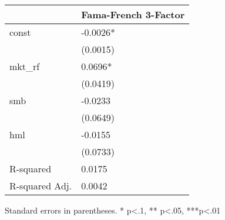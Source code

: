 \begin{table}
\caption{}
\label{}
\begin{center}
\begin{tabular}{ll}
\hline
               & Fama-French 3-Factor  \\
\hline
const          & -0.0026*              \\
               & (0.0015)              \\
mkt\_rf        & 0.0696*               \\
               & (0.0419)              \\
smb            & -0.0233               \\
               & (0.0649)              \\
hml            & -0.0155               \\
               & (0.0733)              \\
R-squared      & 0.0175                \\
R-squared Adj. & 0.0042                \\
\hline
\end{tabular}
\end{center}
\end{table}
\bigskip
Standard errors in parentheses. \newline 
* p<.1, ** p<.05, ***p<.01